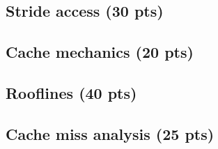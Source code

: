 \renewcommand{\thesubsubsection}{\alph{subsubsection})}
\setcounter{section}{4}
\setcounter{subsection}{0}

\subsection{Stride access (30 pts)}


\subsection{Cache mechanics (20 pts)}


\subsection{Rooflines (40 pts)}


\subsection{Cache miss analysis (25 pts)}

